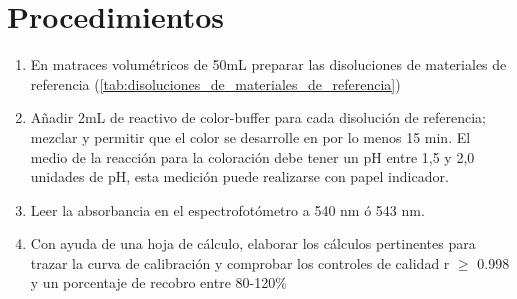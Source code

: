 \section{Procedimientos}

\begin{enumerate}
    \item En matraces volumétricos de 50mL preparar las disoluciones de materiales de referencia (\autoref{tab:disoluciones_de_materiales_de_referencia})
    \item Añadir 2mL de reactivo de color-buffer para cada disolución de referencia; mezclar y permitir que el color se desarrolle en por lo menos 15 min. El medio de la reacción para la coloración debe tener un pH entre 1,5 y 2,0 unidades de pH, esta medición puede realizarse con papel indicador. 
    \item Leer la absorbancia en el espectrofotómetro a 540 nm ó 543 nm.
    \item Con ayuda de una hoja de cálculo, elaborar los cálculos pertinentes para trazar la curva de   calibración y comprobar los controles de calidad r $\geq$ 0.998 y un porcentaje de recobro entre 80-120\%
\end{enumerate}

\begin{table}[H]
\caption{Disoluciones de materiales de referencia}
\label{tab:disoluciones_de_materiales_de_referencia}
\end{table}